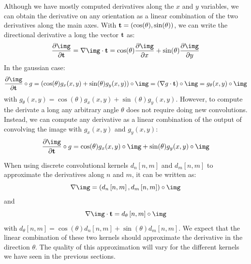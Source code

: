 Although we have mostly computed derivatives along the $x$ and $y$ variables, we can obtain the derivative on any orientation as a linear combination of the two derivatives along the main axes. With ${\bf t}=\left( \cos (\theta), \sin(\theta) \right)$, we can write the directional derivative a long the vector ${\bf t}$ as:
\begin{equation}
\frac{\partial \img}{\partial {\bf t}} =  \nabla \img \cdot {\bf t} = \cos(\theta) \frac{\partial \img}{\partial x} + \sin(\theta) \frac{\partial \img}{\partial y}
\end{equation}
In the gaussian case:
\begin{equation}
\frac{\partial \img}{\partial {\bf t}} \circ g = \left( \cos(\theta) g_x(x,y) + \sin(\theta) g_y(x,y) \right) \circ \img = \left( \nabla g  \cdot {\bf t} \right) \circ \img
= g_{\theta} (x,y)  \circ \img
\end{equation}
with $g_{\theta} (x,y) = \cos(\theta) g_x(x,y) + \sin(\theta) g_y(x,y)$. However, to compute the derivate a long any arbitrary angle $\theta$ does not require doing new convolutions. Instead, we can compute any derivative as a linear combination of the output of convolving the image with $g_x(x,y)$ and $g_y(x,y)$:
\begin{equation}
\frac{\partial \img}{\partial {\bf t}} \circ g =  \cos(\theta) g_x(x,y) \circ \img + \sin(\theta) g_y(x,y) \circ \img 
\end{equation}

When using discrete convolutional kernels $d_n\left[n,m\right]$ and $d_m\left[n,m\right]$ to approximate the derivatives along $n$ and $m$, it can be written as:
\begin{equation}
\nabla \img = \left( d_n\left[n,m\right], d_m\left[n,m\right] \right) \circ \img 
\end{equation}
and
\begin{equation}
\nabla \img \cdot {\bf t} =d_{\theta} \left[n,m\right] \circ \img 
\end{equation}
with $d_{\theta} \left[n,m\right]  = \cos(\theta) d_n\left[n,m\right] + \sin(\theta) d_m\left[n,m\right]$. We expect that the linear combination of these two kernels should approximate the derivative in the direction $\theta$. The quality of this approximation will vary for the different kernels we have seen in the previous sections. 
 
